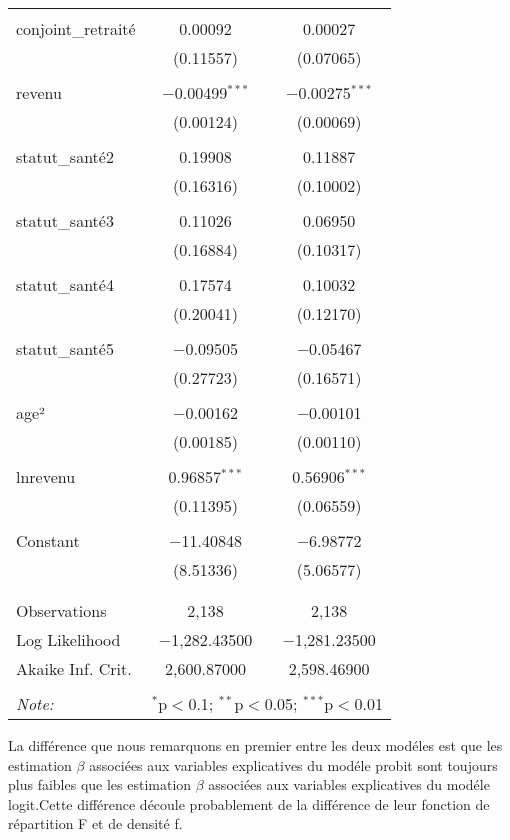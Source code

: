 \documentclass[
  14pt,
  french,
]{article}
\begin{document}
\begin{table}[!htbp]
\begin{tabular}{@{\extracolsep{5pt}}lcc}
  & & \\ 
 conjoint\_retraité & 0.00092 & 0.00027 \\ 
  & (0.11557) & (0.07065) \\ 
  & & \\ 
 revenu & $-$0.00499$^{***}$ & $-$0.00275$^{***}$ \\ 
  & (0.00124) & (0.00069) \\ 
  & & \\ 
 statut\_santé2 & 0.19908 & 0.11887 \\ 
  & (0.16316) & (0.10002) \\ 
  & & \\ 
 statut\_santé3 & 0.11026 & 0.06950 \\ 
  & (0.16884) & (0.10317) \\ 
  & & \\ 
 statut\_santé4 & 0.17574 & 0.10032 \\ 
  & (0.20041) & (0.12170) \\ 
  & & \\ 
 statut\_santé5 & $-$0.09505 & $-$0.05467 \\ 
  & (0.27723) & (0.16571) \\ 
  & & \\ 
 age² & $-$0.00162 & $-$0.00101 \\ 
  & (0.00185) & (0.00110) \\ 
  & & \\ 
 lnrevenu & 0.96857$^{***}$ & 0.56906$^{***}$ \\ 
  & (0.11395) & (0.06559) \\ 
  & & \\ 
 Constant & $-$11.40848 & $-$6.98772 \\ 
  & (8.51336) & (5.06577) \\ 
  & & \\ 
\hline \\[-1.8ex] 
Observations & 2,138 & 2,138 \\ 
Log Likelihood & $-$1,282.43500 & $-$1,281.23500 \\ 
Akaike Inf. Crit. & 2,600.87000 & 2,598.46900 \\ 
\hline 
\hline \\[-1.8ex] 
\textit{Note:}  & \multicolumn{2}{r}{$^{*}$p$<$0.1; $^{**}$p$<$0.05; $^{***}$p$<$0.01} \\ 
\end{tabular} 
\end{table}

La différence que nous remarquons en premier entre les deux modéles est
que les estimation \(\beta\) associées aux variables explicatives du
modéle probit sont toujours plus faibles que les estimation \(\beta\)
associées aux variables explicatives du modéle logit.Cette différence
découle probablement de la différence de leur fonction de répartition F
et de densité f.
\end{document}
